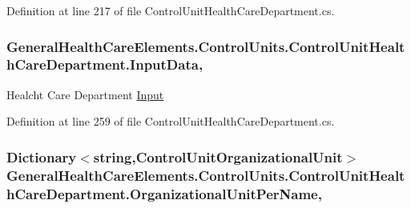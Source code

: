 Definition at line 217 of file Control\+Unit\+Health\+Care\+Department.\+cs.

\subsubsection[{\texorpdfstring{Input\+Data}{InputData}}]{ General\+Health\+Care\+Elements.\+Control\+Units.\+Control\+Unit\+Health\+Care\+Department.\+Input\+Data\hspace{0.3cm}{\ttfamily [get]}, {\ttfamily [set]}}\hypertarget{class_general_health_care_elements_1_1_control_units_1_1_control_unit_health_care_department_a086a9b4e380bee53f84d5b43733002a5}{}\label{class_general_health_care_elements_1_1_control_units_1_1_control_unit_health_care_department_a086a9b4e380bee53f84d5b43733002a5}


Healcht Care Department \hyperlink{namespace_general_health_care_elements_1_1_input}{Input} 



Definition at line 259 of file Control\+Unit\+Health\+Care\+Department.\+cs.

\subsubsection[{\texorpdfstring{Organizational\+Unit\+Per\+Name}{OrganizationalUnitPerName}}]{\setlength{\rightskip}{0pt plus 5cm}Dictionary$<$string,{\bf Control\+Unit\+Organizational\+Unit}$>$ General\+Health\+Care\+Elements.\+Control\+Units.\+Control\+Unit\+Health\+Care\+Department.\+Organizational\+Unit\+Per\+Name\hspace{0.3cm}{\ttfamily [get]}, {\ttfamily [set]}}\hypertarget{class_general_health_care_elements_1_1_control_units_1_1_control_unit_health_care_department_aa25086e836f01a12b9851b417191757a}{}\label{class_general_health_care_elements_1_1_control_units_1_1_control_unit_health_care_department_aa25086e836f01a12b9851b417191757a}


